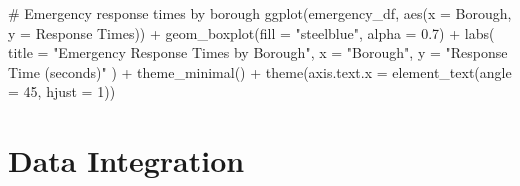 \documentclass[
  letterpaper,
  DIV=11,
  numbers=noendperiod]{scrreprt}
\newenvironment{Shaded}{\begin{snugshade}}{\end{snugshade}}
\newcommand{\AttributeTok}[1]{\textcolor[rgb]{0.40,0.45,0.13}{#1}}
\newcommand{\CommentTok}[1]{\textcolor[rgb]{0.37,0.37,0.37}{#1}}
\newcommand{\DecValTok}[1]{\textcolor[rgb]{0.68,0.00,0.00}{#1}}
\newcommand{\FloatTok}[1]{\textcolor[rgb]{0.68,0.00,0.00}{#1}}
\newcommand{\FunctionTok}[1]{\textcolor[rgb]{0.28,0.35,0.67}{#1}}
\newcommand{\NormalTok}[1]{\textcolor[rgb]{0.00,0.23,0.31}{#1}}
\newcommand{\SpecialCharTok}[1]{\textcolor[rgb]{0.37,0.37,0.37}{#1}}
\newcommand{\StringTok}[1]{\textcolor[rgb]{0.13,0.47,0.30}{#1}}
\begin{document}
\begin{Shaded}
\begin{Highlighting}[]
\CommentTok{\# Emergency response times by borough}
\FunctionTok{ggplot}\NormalTok{(emergency\_df, }\FunctionTok{aes}\NormalTok{(}\AttributeTok{x =}\NormalTok{ Borough, }\AttributeTok{y =} \StringTok{\textasciigrave{}}\AttributeTok{Response Times}\StringTok{\textasciigrave{}}\NormalTok{)) }\SpecialCharTok{+}
  \FunctionTok{geom\_boxplot}\NormalTok{(}\AttributeTok{fill =} \StringTok{"steelblue"}\NormalTok{, }\AttributeTok{alpha =} \FloatTok{0.7}\NormalTok{) }\SpecialCharTok{+}
  \FunctionTok{labs}\NormalTok{(}
    \AttributeTok{title =} \StringTok{"Emergency Response Times by Borough"}\NormalTok{,}
    \AttributeTok{x =} \StringTok{"Borough"}\NormalTok{,}
    \AttributeTok{y =} \StringTok{"Response Time (seconds)"}
\NormalTok{  ) }\SpecialCharTok{+}
  \FunctionTok{theme\_minimal}\NormalTok{() }\SpecialCharTok{+}
  \FunctionTok{theme}\NormalTok{(}\AttributeTok{axis.text.x =} \FunctionTok{element\_text}\NormalTok{(}\AttributeTok{angle =} \DecValTok{45}\NormalTok{, }\AttributeTok{hjust =} \DecValTok{1}\NormalTok{))}
\end{Highlighting}
\end{Shaded}

\section{Data Integration}\label{data-integration}
\end{document}
